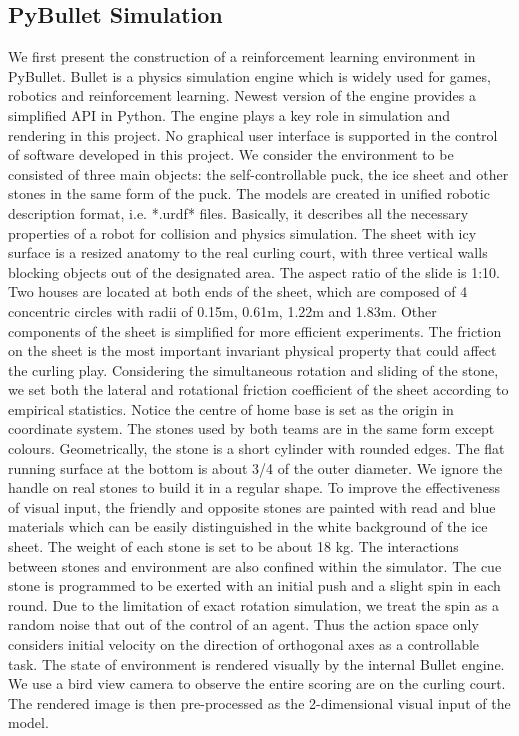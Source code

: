 \documentclass[oneside,11pt,a4paper]{article}
\begin{document}
\subsection{PyBullet Simulation}
We first present the construction of a reinforcement learning environment in PyBullet. Bullet is a physics simulation engine which is widely used for games, robotics and reinforcement learning. Newest version of the engine provides a simplified API in Python. The engine plays a key role in simulation and rendering in this project. No graphical user interface is supported in the control of software developed in this project.
\newline
\newline
\noindent
We consider the environment to be consisted of three main objects: the self-controllable puck, the ice sheet and other stones in the same form of the puck. The models are created in unified robotic description format, i.e. *.urdf* files. Basically, it describes all the necessary properties of a robot for collision and physics simulation. The sheet with icy surface is a resized anatomy to the real curling court, with three vertical walls blocking objects out of the designated area. The aspect ratio of the slide is 1:10. Two houses are located at both ends of the sheet, which are composed of 4 concentric circles with radii of 0.15m, 0.61m, 1.22m and 1.83m. Other components of the sheet is simplified for more efficient experiments. The friction on the sheet is the most important invariant physical property that could affect the curling play. Considering the simultaneous rotation and sliding of the stone, we set both the lateral and rotational friction coefficient of the sheet according to empirical statistics. Notice the centre of home base is set as the origin in coordinate system.
\newline
\newline
\noindent
The stones used by both teams are in the same form except colours. Geometrically, the stone is a short cylinder with rounded edges. The flat running surface at the bottom is about 3/4 of the outer diameter. We ignore the handle on real stones to build it in a regular shape. To improve the effectiveness of visual input, the friendly and opposite stones are painted with read and blue materials which can be easily distinguished in the white background of the ice sheet. The weight of each stone is set to be about 18 kg.
\newline
\newline
\noindent
The interactions between stones and environment are also confined within the simulator. The cue stone is programmed to be exerted with an initial push and a slight spin in each round. Due to the limitation of exact rotation simulation, we treat the spin as a random noise that out of the control of an agent. Thus the action space only considers initial velocity on the direction of orthogonal axes as a controllable task. The state of environment is rendered visually by the internal Bullet engine. We use a bird view camera to observe the entire scoring are on the curling court. The rendered image is then pre-processed as the 2-dimensional visual input of the model.
\end{document}
